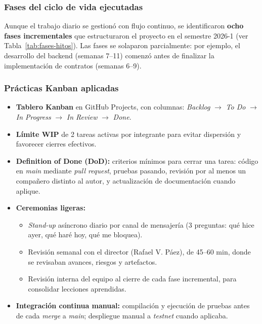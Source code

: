 \documentclass[12pt,oneside]{report}
\begin{document}
      \subsubsection{Fases del ciclo de vida ejecutadas}
      Aunque el trabajo diario se gestionó con flujo continuo, se identificaron \textbf{ocho fases incrementales} que estructuraron el proyecto en el semestre 2026-1 (ver Tabla~\ref{tab:fases-hitos}). Las fases se solaparon parcialmente: por ejemplo, el desarrollo del backend (semanas 7--11) comenzó antes de finalizar la implementación de contratos (semanas 6--9).

      \subsubsection{Prácticas Kanban aplicadas}
      \begin{itemize}
        \item \textbf{Tablero Kanban} en GitHub Projects, con columnas: \textit{Backlog} $\rightarrow$ \textit{To Do} $\rightarrow$ \textit{In Progress} $\rightarrow$ \textit{In Review} $\rightarrow$ \textit{Done}.
        \item \textbf{Límite WIP} de 2 tareas activas por integrante para evitar dispersión y favorecer cierres efectivos.
        \item \textbf{Definition of Done (DoD):} criterios mínimos para cerrar una tarea: código en \textit{main} mediante \textit{pull request}, pruebas pasando, revisión por al menos un compañero distinto al autor, y actualización de documentación cuando aplique.
        \item \textbf{Ceremonias ligeras:}
          \begin{itemize}
            \item \textit{Stand-up} asíncrono diario por canal de mensajería (3 preguntas: qué hice ayer, qué haré hoy, qué me bloquea).
            \item Revisión semanal con el director (Rafael V. Páez), de 45--60 min, donde se revisaban avances, riesgos y artefactos.
            \item Revisión interna del equipo al cierre de cada fase incremental, para consolidar lecciones aprendidas.
          \end{itemize}
        \item \textbf{Integración continua manual:} compilación y ejecución de pruebas antes de cada \textit{merge} a \textit{main}; despliegue manual a \textit{testnet} cuando aplicaba.
      \end{itemize}
\end{document}
